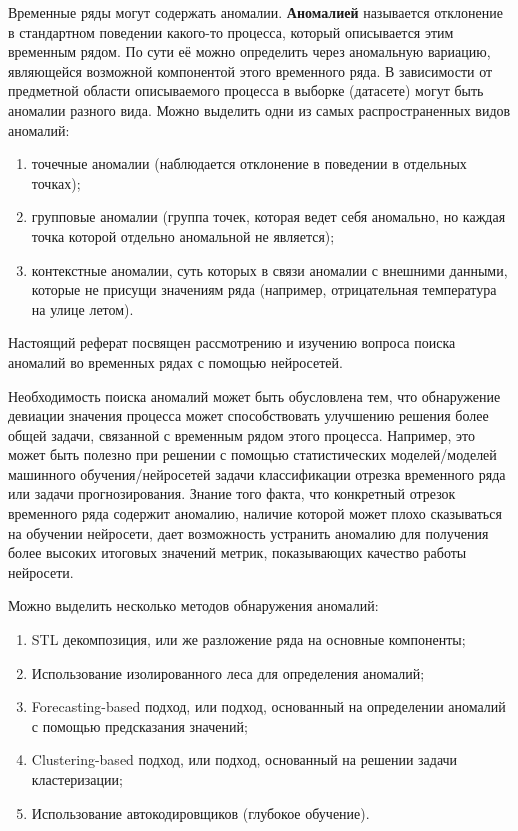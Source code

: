 \documentclass[bachelor, och, referat]{../shiza}
\begin{document}
    Временные ряды могут содержать аномалии. \textbf{Аномалией} называется
    отклонение в стандартном поведении какого-то процесса, который описывается
    этим временным рядом. По сути её можно определить через аномальную вариацию,
    являющейся возможной компонентой этого временного ряда. В зависимости от
    предметной области описываемого процесса в выборке (датасете) могут быть
    аномалии разного вида. Можно выделить одни из самых распространенных видов
    аномалий:

    \begin{enumerate}
        \item точечные аномалии (наблюдается отклонение в поведении в
        отдельных точках);
        \item групповые аномалии (группа точек, которая ведет себя аномально, но
        каждая точка которой отдельно аномальной не является);
        \item контекстные аномалии, суть которых в связи аномалии с внешними
        данными, которые не присущи значениям ряда (например, отрицательная
        температура на улице летом).
    \end{enumerate}

    Настоящий реферат посвящен рассмотрению и изучению вопроса поиска аномалий
    во временных рядах с помощью нейросетей.

    Необходимость поиска аномалий может быть обусловлена тем, что обнаружение
    девиации значения процесса может способствовать улучшению решения более
    общей задачи, связанной с временным рядом этого процесса. Например, это
    может быть полезно при решении с помощью статистических моделей/моделей
    машинного обучения/нейросетей задачи классификации отрезка временного ряда
    или задачи прогнозирования. Знание того факта, что конкретный отрезок
    временного ряда содержит аномалию, наличие которой может плохо сказываться
    на обучении нейросети, дает возможность устранить аномалию для получения
    более высоких итоговых значений метрик, показывающих качество работы
    нейросети.

    Можно выделить несколько методов обнаружения аномалий:

    \begin{enumerate}
        \item STL декомпозиция, или же разложение ряда на основные компоненты;
        \item Использование изолированного леса для определения аномалий;
        \item Forecasting-based подход, или подход, основанный на определении
        аномалий с помощью предсказания значений;
        \item Clustering-based подход, или подход, основанный на решении задачи
        кластеризации;
        \item Использование автокодировщиков (глубокое обучение).
    \end{enumerate}
\end{document}
